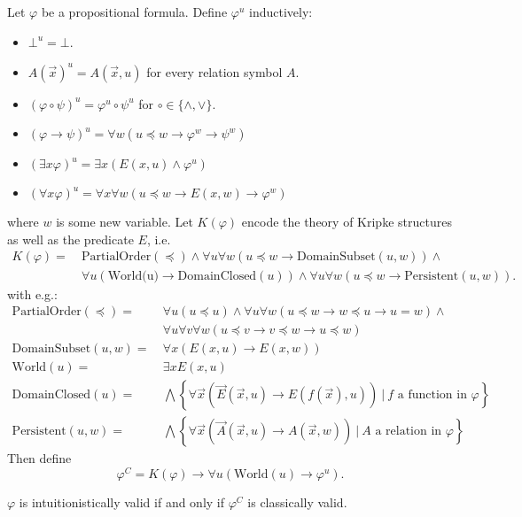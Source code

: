 \documentclass[runningheads]{llncs}
\begin{document}
\begin{definition}\label{def:fo-translation}
	Let $\varphi$ be a propositional formula. Define $\varphi^{u}$ inductively:
	\begin{itemize}
		\item $\bot^u = \bot$.
		\item $A(\vec x)^{u} = A(\vec x, u)$ for every relation symbol $A$.
		\item $(\varphi\circ\psi)^u = \varphi^u\circ\psi^u$ for $\circ\in\{\wedge, \vee\}$.
		\item $(\varphi\to \psi)^u = \forall w(u\preceq w\to\varphi^{w}\to\psi^{w})$
		\item $(\exists x\varphi)^u = \exists x(E(x,u)\wedge\varphi^u)$
		\item $(\forall x\varphi)^u = \forall x\forall w(u\preceq w\to E(x, w)\to \varphi^w)$
	\end{itemize}
	where $w$ is some new variable. Let $K(\varphi)$ encode the theory of Kripke structures as well as the predicate $E$, i.e.
	\begin{align*}
		K(\varphi) = \:& \text{PartialOrder}(\preceq) \wedge \forall u \forall w (u\preceq w\to \text{DomainSubset}(u, w)) \wedge\\
		& \forall u(\text{World(u)}\to \text{DomainClosed}(u))\wedge \forall u\forall w (u\preceq w\to \text{Persistent}(u, w)).
	\end{align*}
	with e.g.:
	\begin{align*}
		\text{PartialOrder}(\preceq) = &\:\forall u(u\preceq u)\wedge\forall u\forall w(u\preceq w\to w\preceq u\to u = w)\wedge\\&\:\forall u\forall v\forall w(u\preceq v\to v\preceq w\to u\preceq w)\\
		\text{DomainSubset}(u, w) = &\:\forall x(E(x, u)\to E(x, w))\\
		\text{World}(u) = &\:\exists xE(x, u)\\
		\text{DomainClosed}(u) = &\:\bigwedge\left\{\forall\vec x(\vec E(\vec x, u)\to E(f(\vec x), u))\:|\:\text{$f$ a function in $\varphi$}\right\}\\
		\text{Persistent}(u, w) = &\:\bigwedge\left\{\forall\vec x(\vec A(\vec x, u)\to A(\vec x, w))\:|\:\text{$A$ a relation in $\varphi$}\right\}
	\end{align*}
	Then define
	$$\varphi^C = K(\varphi)\to\forall u(\text{World}(u)\to \varphi^u).$$
\end{definition}

\begin{lemma}\label{lemma:fo-simplification}
	$\varphi$ is intuitionistically valid if and only if $\varphi^C$ is classically valid.
\end{lemma}
\end{document}
